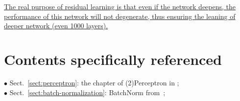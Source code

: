 \documentclass[10pt,onecolumn]{book}
\begin{document}
\uline{The real purpose of residual learning is that even if the network deepens, the performance of this network will not degenerate, thus ensuring the leaning of deeper network (even 1000 layers).}

\chapter{Contents specifically referenced}
\noindent $\bullet$ Sect.~\ref{sect:perceptron}: the chapter of (2)Perceptron in \cite{hangli2012}; \\
$\bullet$ Sect.~\ref{sect:batch-normalization}: BatchNorm from~\cite{ioffe2015batch};

{\small


}
\end{document}
